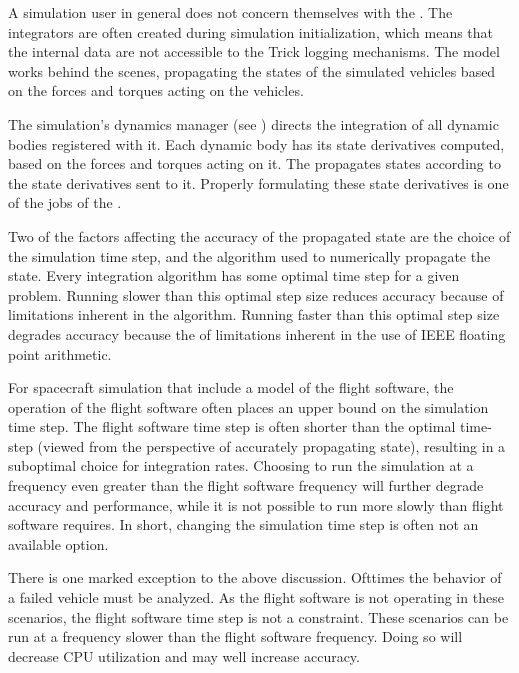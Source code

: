 A simulation user in general does not concern themselves with the \ModelDesc.
The integrators are often created during simulation initialization, which
means that the internal data are not accessible to the Trick logging
mechanisms.
The model works behind the scenes, propagating the states of the simulated
vehicles based on the forces and torques acting on the vehicles.

The simulation's dynamics
manager (see ) directs the
integration of all dynamic bodies registered with it.
Each dynamic body has its state derivatives computed, based on the forces and 
torques acting on it.
The \ModelDesc propagates states according to the state derivatives sent
to it. Properly formulating these state derivatives is one of the jobs of the
.

Two of the factors affecting the accuracy of the propagated state are the
choice of the simulation time step, and the algorithm used to numerically 
propagate the state. Every integration algorithm has some optimal
time step for a given problem. Running slower than this optimal step
size reduces accuracy because of limitations inherent in the algorithm.
Running faster than this optimal step size degrades accuracy because the
of limitations inherent in the use of IEEE floating point arithmetic.

For spacecraft simulation that include a model of the flight software, the
operation of the flight software often places an upper bound on the simulation 
time step.  The flight software time step is often shorter than the optimal 
time-step (viewed from the perspective of accurately propagating state), 
resulting in a suboptimal choice for integration rates.  Choosing to run 
the simulation at a frequency even greater
than the flight software frequency will further degrade accuracy and 
performance, while it is not possible to run more slowly than flight software 
requires.  In short, changing the simulation time step is often not an 
available option.

There is one marked exception to the above discussion. Ofttimes the behavior
of a failed vehicle must be analyzed. As the flight software is not operating
in these scenarios, the flight software time step is not a constraint.
These scenarios can be run at a frequency slower than the flight software
frequency. Doing so will decrease CPU utilization and may well increase 
accuracy.

